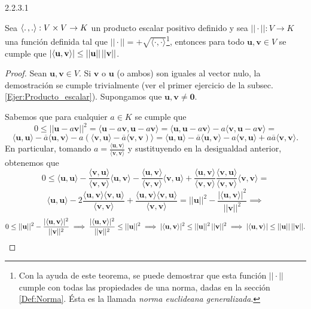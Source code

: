 \begin{teorema} {2.2.3.1} 

    Sea $\langle.\hspace{0.5mm},.\rangle:V\times V\rightarrow K$ un producto escalar positivo definido y sea $||\cdot ||:V\rightarrow K$ una función definida tal que $||\cdot||=+\sqrt{\langle\cdot,\cdot\rangle}$\footnote{Con la ayuda de este teorema, se puede demostrar que esta función $||\cdot ||$ cumple con todas las propiedades de una norma, dadas en la sección \ref{Def:Norma}. Ésta es la llamada \emph{norma euclideana generalizada}.}, entonces para todo $\mathbf{u},\mathbf{v}\in V$ se cumple que $|\langle\mathbf{u},\mathbf{v}\rangle|\leq ||\mathbf{u}||\hspace{0.5mm}||\mathbf{v}||$.

\begin{proof}
    Sean $\mathbf{u},\mathbf{v}\in V.$ Si $\mathbf{v}$ o $\mathbf{u}$ (o ambos) son iguales al vector nulo, la demostración se cumple trivialmente (ver el primer ejercicio de la subsec. \ref{Ejer:Producto_escalar}). Supongamos que $\mathbf{u},\mathbf{v}\neq\mathbf{0}$. 

    Sabemos que para cualquier $a\in K$ se cumple que $$0\leq ||\mathbf{u}-a\mathbf{v}||^2 = \langle\mathbf{u}-a\mathbf{v},\mathbf{u}-a\mathbf{v}\rangle= \langle\mathbf{u},\mathbf{u}-a\mathbf{v}\rangle-a\langle\mathbf{v},\mathbf{u}-a\mathbf{v}\rangle=$$ $$\langle\mathbf{u},\mathbf{u}\rangle-\overline{a}\langle\mathbf{u},\mathbf{v}\rangle-a(\langle\mathbf{v},\mathbf{u}\rangle-\overline{a}\langle\mathbf{v},\mathbf{v})\rangle=\langle\mathbf{u},\mathbf{u}\rangle-\overline{a}\langle\mathbf{u},\mathbf{v}\rangle-a\langle\mathbf{v},\mathbf{u}\rangle+a\overline{a}\langle\mathbf{v},\mathbf{v}\rangle.$$ \noindent En particular, tomando $a=\frac{\langle\mathbf{u},\mathbf{v}\rangle}{\langle\mathbf{v},\mathbf{v}\rangle}$ y sustituyendo en la desigualdad anterior, obtenemos que $$0\leq\langle\mathbf{u},\mathbf{u}\rangle-\frac{\langle\mathbf{v},\mathbf{u}\rangle}{\langle\mathbf{v},\mathbf{v}\rangle}\langle\mathbf{u},\mathbf{v}\rangle-\frac{\langle\mathbf{u},\mathbf{v}\rangle}{\langle\mathbf{v},\mathbf{v}\rangle}\langle\mathbf{v},\mathbf{u}\rangle+\frac{\langle\mathbf{u},\mathbf{v}\rangle}{\langle\mathbf{v},\mathbf{v}\rangle}\frac{\langle\mathbf{v},\mathbf{u}\rangle}{\langle\mathbf{v},\mathbf{v}\rangle}\langle\mathbf{v},\mathbf{v}\rangle=$$ $$\langle\mathbf{u},\mathbf{u}\rangle-2\frac{\langle\mathbf{u},\mathbf{v}\rangle\langle\mathbf{v},\mathbf{u}\rangle}{\langle\mathbf{v},\mathbf{v}\rangle}+\frac{\langle\mathbf{u},\mathbf{v}\rangle\langle\mathbf{v},\mathbf{u}\rangle}{\langle\mathbf{v},\mathbf{v}\rangle}=||\mathbf{u}||^2-\frac{|\langle\mathbf{u},\mathbf{v}\rangle|^2}{||\mathbf{v}||^2}\implies$$ $$0\leq ||\mathbf{u}||^2-\frac{|\langle\mathbf{u},\mathbf{v}\rangle|^2}{||\mathbf{v}||^2}\implies \frac{|\langle\mathbf{u},\mathbf{v}\rangle|^2}{||\mathbf{v}||^2}\leq ||\mathbf{u}||^2\implies|\langle\mathbf{u},\mathbf{v}\rangle|^2\leq ||\mathbf{u}||^2\hspace{0.5mm}||\mathbf{v}||^2\implies|\langle\mathbf{u},\mathbf{v}\rangle|\leq ||\mathbf{u}||\hspace{0.5mm}||\mathbf{v}||.$$


\end{proof}
\end{teorema}
